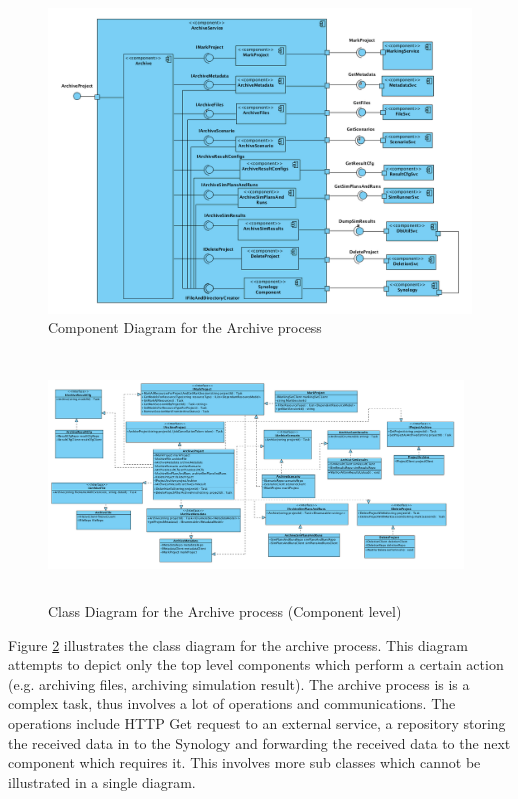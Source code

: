 \begin{figure}[H]
    \centering \includegraphics[scale=0.45]{grafiken/archiveComponent.png}
    \caption{Component Diagram for the Archive process}
    \label{fig:archiveComponent}
\end{figure}



\begin{figure}[H]
    \centering \includegraphics[height=6.5cm, angle=90, origin=c, width=11cm]{grafiken/archiveClassDiagram.png}
    \caption{Class Diagram for the Archive process (Component level)}
    \label{fig:archiveClassDiagram}
\end{figure}

Figure \ref{fig:archiveClassDiagram} illustrates the class diagram for the archive process. This diagram attempts to depict only the top level components
which perform a certain action (e.g. archiving files, archiving simulation result). The archive process is is a complex 
task, thus involves a lot of operations and communications. The operations include HTTP Get request to an external service, a repository storing the received
data in to the Synology and forwarding the received data to the next component which requires it. This involves more sub classes which cannot be illustrated in a single diagram. 

